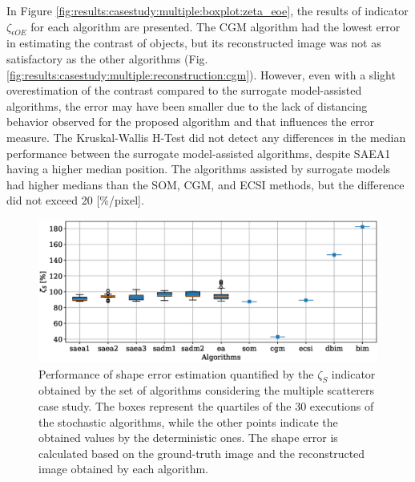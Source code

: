 			In Figure \ref{fig:results:casestudy:multiple:boxplot:zeta_eoe}, the results of indicator $\zeta_{\epsilon OE}$ for each algorithm are presented. The CGM algorithm had the lowest error in estimating the contrast of objects, but its reconstructed image was not as satisfactory as the other algorithms (Fig. \ref{fig:results:casestudy:multiple:reconstruction:cgm}). However, even with a slight overestimation of the contrast compared to the surrogate model-assisted algorithms, the error may have been smaller due to the lack of distancing behavior observed for the proposed algorithm and that influences the error measure. The Kruskal-Wallis H-Test did not detect any differences in the median performance between the surrogate model-assisted algorithms, despite SAEA1 having a higher median position. The algorithms assisted by surrogate models had higher medians than the SOM, CGM, and ECSI methods, but the difference did not exceed 20 [\%/pixel].
		
			\begin{figure}
				\centering
				\includegraphics[width=.9\textwidth]{./figuras/casestudy/multiple/boxplot_zeta_s}
				\caption[Performance of shape error estimation quantified by the $\zeta_S$ indicator obtained by the set of algorithms considering the multiple scatterers case study.]{Performance of shape error estimation quantified by the $\zeta_S$ indicator obtained by the set of algorithms considering the multiple scatterers case study. The boxes represent the quartiles of the 30 executions of the stochastic algorithms, while the other points indicate the obtained values by the deterministic ones. The shape error is calculated based on the ground-truth image and the reconstructed image obtained by each algorithm.}
				\label{fig:results:casestudy:multiple:boxplot:zeta_s}
			\end{figure}
			
